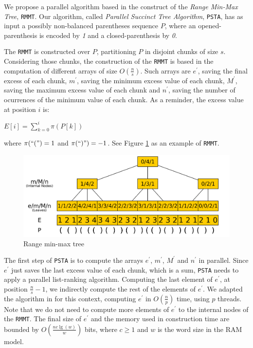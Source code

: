 We propose a parallel algorithm based in the construct of the \emph{Range Min-Max Tree}, {\tt RMMT}\cite{Navarro:2014:FFS:2620785.2601073}. Our algorithm, called \emph{Parallel Succinct Tree Algorithm}, {\tt PSTA}, has as input a possibly non-balanced parentheses sequence $P$, where an opened-parenthesis is encoded by \emph{1} and a closed-parenthesis by \emph{0}.

The {\tt RMMT} is constructed over $P$, partitioning $P$ in disjoint chunks of size $s$. Considering those chunks, the construction of the {\tt RMMT} is based in the computation of different arrays of size $O(\frac{n}{s})$. Such arrays are $e^{\prime}$, saving the final excess of each chunk, $m^{\prime}$, saving the minimum excess value of each chunk, $M^{\prime}$, saving the maximum excess value of each chunk and $n^{\prime}$, saving the number of ocurrences of the minimum value of each chunk. As a reminder, the excess value at position $i$ is:
	\begin{center}
		$\displaystyle E[i] = \sum_{k=0}^{i} \pi(P[k])$	
	\end{center}

where $\pi(``(") = 1$ and $\pi(``)") = -1$. See Figure \ref{fig:RangeMinMaxTree} as an example of {\tt RMMT}.

 	\begin{figure}[ht]
		\centering
		\includegraphics[scale=0.13]{./images/Range-min-max-tree.png}
     	\caption{Range min-max tree}
		\label{fig:RangeMinMaxTree} 
	\end{figure}

The first step of {\tt PSTA} is to compute the arrays $e^{\prime}$, $m^{\prime}$, $M^{\prime}$ and $n^{\prime}$ in parallel. Since $e^{\prime}$ just saves the last excess value of each chunk, which is a sum, {\tt PSTA} needs to apply a parallel list-ranking algorithm. Computing the last element of $e^{\prime}$, at position $\frac{n}{s}-1$, we indirectly compute the rest of the elements of $e^{\prime}$. We adapted the algorithm in \cite{Helman2001265} for this context, computing $e^{\prime}$ in $O(\frac{n}{p})$ time, using $p$ threads. Note that we do not need to compute more elements of $e^{\prime}$ to the internal nodes of the {\tt RMMT}. The final size of $e^{\prime}$  and the memory used in construction time are bounded by $O(\frac{nc\lg(w)}{w})$ bits, where $c\geqslant 1$ and $w$ is the word size in the RAM model.

